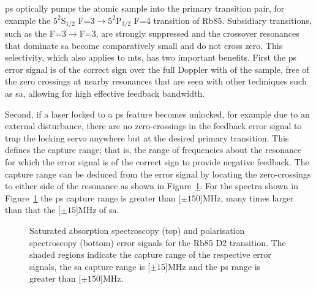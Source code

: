 \Gls{ps} optically pumps the atomic sample into the primary transition pair, for example the $5^2$S$_{1/2}$ F=3$\rightarrow5^2$P$_{3/2}$ F=4 transition of Rb85.
Subsidiary transitions, such as the F=3$\rightarrow$F=3, are strongly suppressed and the crossover resonances that dominate \gls{sa} become comparatively small and do not cross zero.
This selectivity, which also applies to \gls{mts}, has two important benefits.
First the \gls{ps} error signal is of the correct sign over the full Doppler with of the sample, free of the zero crossings at nearby resonances that are seen with other techniques such as \gls{sa}, allowing for high effective feedback bandwidth.

Second, if a laser locked to a \gls{ps} feature becomes unlocked, for example due to an external disturbance, there are no zero-crossings in the feedback error signal to trap the locking servo anywhere but at the desired primary transition.
This defines the capture range; that is, the range of frequencies about the resonance for which the error signal is of the correct sign to provide negative feedback.
The capture range can be deduced from the error signal by locating the zero-crossings to either side of the resonance as shown in Figure~\ref{figure:capture_range}.
For the spectra shown in Figure~\ref{figure:capture_range} the \gls{ps} capture range is greater than \unit[$\pm150$]{MHz}, many times larger than that the \unit[$\pm15$]{MHz} of \gls{sa}.

\begin{figure}
\center

\caption[Saturated absorption spectroscopy and polarisation spectroscopy capture ranges.]{Saturated absorption spectroscopy (top) and polarisation spectroscopy (bottom) error signals for the Rb85 D2 transition.
The shaded regions indicate the capture range of the respective error signals, the \gls{sa} capture range is \unit[$\pm15$]{MHz} and the \gls{ps} range is greater than \unit[$\pm150$]{MHz}.}
\label{figure:capture_range}
\end{figure}
